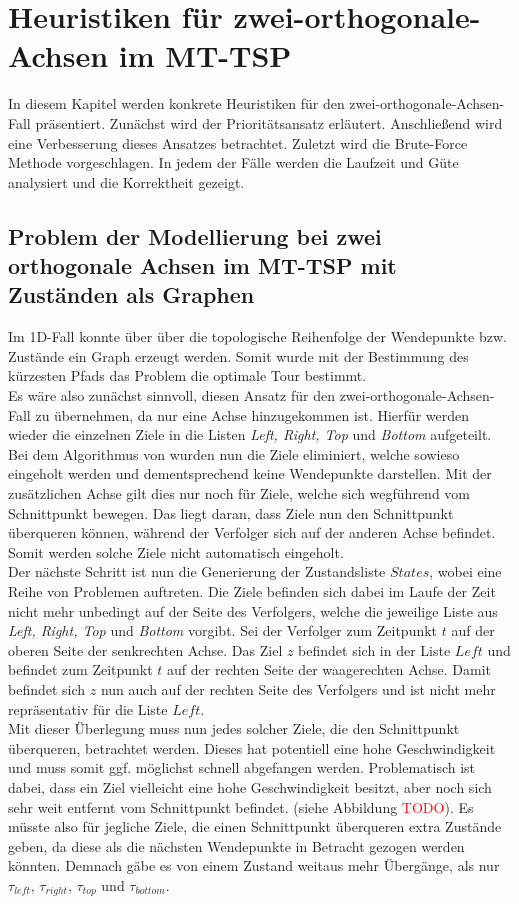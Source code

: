 \documentclass[german,version-2019-11]{uzl-thesis}
\begin{document}
\chapter{Heuristiken für zwei-orthogonale-Achsen im MT-TSP}

In diesem Kapitel werden konkrete Heuristiken für den zwei-orthogonale-Achsen-Fall präsentiert. Zunächst wird der Prioritätsansatz erläutert. Anschließend wird eine Verbesserung dieses Ansatzes betrachtet. Zuletzt wird die Brute-Force Methode vorgeschlagen. In jedem der Fälle werden die Laufzeit und Güte analysiert und die Korrektheit gezeigt.

\section{Problem der Modellierung bei zwei orthogonale Achsen im MT-TSP mit Zuständen als Graphen}
Im 1D-Fall konnte über über die topologische Reihenfolge der Wendepunkte bzw. Zustände ein Graph erzeugt werden. Somit wurde mit der Bestimmung des kürzesten Pfads das Problem die optimale Tour bestimmt. \\
Es wäre also zunächst sinnvoll, diesen Ansatz für den zwei-orthogonale-Achsen-Fall zu übernehmen, da nur eine Achse hinzugekommen ist. Hierfür werden wieder die einzelnen Ziele in die Listen \emph{Left, Right, Top} und \emph{Bottom} aufgeteilt. Bei dem Algorithmus von \cite{helvig} wurden nun die Ziele eliminiert, welche sowieso eingeholt werden und dementsprechend keine Wendepunkte darstellen. Mit der zusätzlichen Achse gilt dies nur noch für Ziele, welche sich wegführend vom Schnittpunkt bewegen. Das liegt daran, dass Ziele nun den Schnittpunkt überqueren können, während der Verfolger sich auf der anderen Achse befindet. Somit werden solche Ziele nicht automatisch eingeholt. \\
Der nächste Schritt ist nun die Generierung der Zustandsliste $States$, wobei eine Reihe von Problemen auftreten. Die Ziele befinden sich dabei im Laufe der Zeit nicht mehr unbedingt auf der Seite des Verfolgers, welche die jeweilige Liste aus \emph{Left, Right, Top} und \emph{Bottom} vorgibt. Sei der Verfolger zum Zeitpunkt $t$ auf der oberen Seite der senkrechten Achse. Das Ziel $z$ befindet sich in der Liste $Left$ und befindet zum Zeitpunkt $t$ auf der rechten Seite der waagerechten Achse. Damit befindet sich $z$ nun auch auf der rechten Seite des Verfolgers und ist nicht mehr repräsentativ für die Liste $Left$. \\
Mit dieser Überlegung muss nun jedes solcher Ziele, die den Schnittpunkt überqueren, betrachtet werden. Dieses hat potentiell eine hohe Geschwindigkeit und muss somit ggf. möglichst schnell abgefangen werden. Problematisch ist dabei, dass ein Ziel vielleicht eine hohe Geschwindigkeit besitzt, aber noch sich sehr weit entfernt vom Schnittpunkt befindet. (siehe Abbildung \textcolor{red}{TODO}). Es müsste also für jegliche Ziele, die einen Schnittpunkt überqueren extra Zustände geben, da diese als die nächsten Wendepunkte in Betracht gezogen werden könnten. Demnach gäbe es von einem Zustand weitaus mehr Übergänge, als nur $\tau_{left}$, $\tau_{right}$, $\tau_{top}$ und $\tau_{bottom}$. \\
\end{document}
